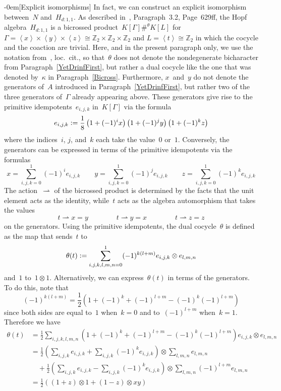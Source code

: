 \documentclass{article}
\makeatletter
\renewcommand{\subsection}{\@startsection{subsection}{2}{0em}%
{\baselineskip}{-0em}{\bfseries\normalsize}}
\numberwithin{equation}{section}
\theoremstyle{definition}
\theoremstyle{break}
\newcommand{\ot}{\mathbin{\otimes}}
\newcommand{\deq}{\vcentcolon =}
\newcommand{\1}{{(1)}}
\newcommand{\2}{{(2)}}
\newcommand{\3}{{(3)}}
\newcommand{\Z}{{\mathbb Z}}
\makeatother
\begin{document}
\subsection[Explicit isomorphisms]{} \label{H16}
In fact, we can construct an explicit isomorphism between~$N$ and~$H_{d:1,1}$. As described in~\cite{Ka}, Paragraph~3.2, Page~629ff, the Hopf algebra~$H_{d:1,1}$ is a bicrossed product~$K[\Gamma] \#^{\theta} K[L]$ for
$\Gamma =\left\langle x \right \rangle \times \left \langle y \right\rangle \times \left\langle z \right\rangle \cong \Z_2 \times \Z_2 \times \Z_2$
and \mbox{$L = \left\langle t \right\rangle \cong \Z_2$} in which the cocycle and the coaction are trivial. Here, and in the present paragraph only, we use the notation from~\cite{Ka}, loc.~cit., so that~$\theta$ does not denote the nondegenerate bicharacter from Paragraph~\ref{YetDrinfFirst}, but rather a dual cocycle like the one that was denoted by~$\kappa$ in Paragraph~\ref{Bicross}. Furthermore, $x$~and~$y$ do not denote the generators of~$A$ introduced in Paragraph~\ref{YetDrinfFirst}, but rather two of the three generators of~$\Gamma$ already appearing above. These generators give rise to the primitive idempotents~$e_{i,j,k}$ in~$K[\Gamma]$ via the formula
\[e_{i,j,k} \deq
\frac{1}{8} \left( 1 + (-1)^i x\right) \left( 1 + (-1)^j y\right) \left( 1 + (-1)^k z \right)\]
where the indices~$i$, $j$, and~$k$ each take the value~$0$ or~$1$. Conversely, the generators can be expressed in terms of the primitive idempotents via the formulas
\[x =\sum_{i,j,k=0}^{1} (-1)^i e_{i,j,k} \qquad
y =\sum_{i,j,k=0}^{1} (-1)^j e_{i,j,k} \qquad
z =\sum_{i,j,k=0}^{1} (-1)^k e_{i,j,k}\]
The action~$\rightharpoonup$ of the bicrossed product is determined by the facts that the unit element acts as the identity, while~$t$ acts as the algebra automorphism that takes the values
\[t \rightharpoonup x = y \qquad \qquad
t \rightharpoonup y = x \qquad \qquad
t \rightharpoonup  z = z \]
on the generators. Using the primitive idempotents, the dual cocycle~$\theta$ is defined as the map that sends~$t$ to
\[\theta(t) \deq \sum_{i,j,k,l,m,n=0}^{1} (-1)^{k (l+m)} e_{i,j,k} \ot e_{l,m,n} \]
and~$1$ to~$1 \ot 1$. Alternatively, we can express~$\theta(t)$ in terms of the generators. To do this, note that
\[ (-1)^{k (l+m)} = \frac{1}{2} (1 + (-1)^k + (-1)^{l+m} - (-1)^k (-1)^{l+m})\]
since both sides are equal to~$1$ when~$k=0$ and to~$(-1)^{l+m}$ when~$k=1$. Therefore we have
\begin{align*}
\theta (t) &= \frac{1}{2} \sum_{i,j,k,l,m,n}
\left(1 + (-1)^k + (-1)^{l+m} - (-1)^k (-1)^{l+m} \right) e_{i,j,k} \ot e_{l,m,n} \\
&=  \frac{1}{2}\left( \sum_{i,j,k} e_{i,j,k}+\sum_{i,j,k} (-1)^k e_{i,j,k}\right) \ot \sum_{l,m,n} e_{l,m,n} \\
&\quad +\frac{1}{2}\left(\sum_{i,j,k} e_{i,j,k} - \sum_{i,j,k} (-1)^k e_{i,j,k}\right) \ot \sum_{l,m,n} (-1)^{l+m} e_{l,m,n} \\
&=\frac{1}{2}\left( (1+z) \ot 1 +(1-z) \ot xy \right)
\end{align*}
\end{document}
